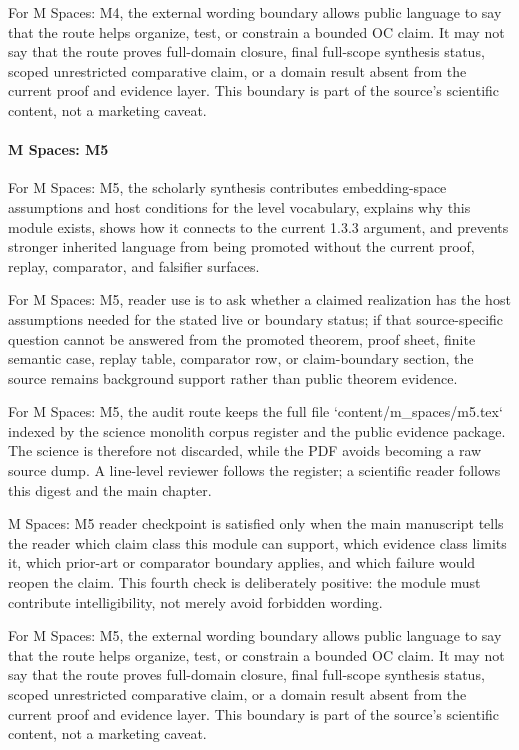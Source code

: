 For M Spaces: M4, the external wording boundary allows public language to say that the route helps organize, test, or constrain a bounded OC claim. It may not say that the route proves full-domain closure, final full-scope synthesis status, scoped unrestricted comparative claim, or a domain result absent from the current proof and evidence layer. This boundary is part of the source's scientific content, not a marketing caveat.


\paragraph{M Spaces: M5}

For M Spaces: M5, the scholarly synthesis contributes embedding-space assumptions and host conditions for the level vocabulary, explains why this module exists, shows how it connects to the current 1.3.3 argument, and prevents stronger inherited language from being promoted without the current proof, replay, comparator, and falsifier surfaces.


For M Spaces: M5, reader use is to ask whether a claimed realization has the host assumptions needed for the stated live or boundary status; if that source-specific question cannot be answered from the promoted theorem, proof sheet, finite semantic case, replay table, comparator row, or claim-boundary section, the source remains background support rather than public theorem evidence.


For M Spaces: M5, the audit route keeps the full file `content/m\_spaces/m5.tex` indexed by the science monolith corpus register and the public evidence package. The science is therefore not discarded, while the PDF avoids becoming a raw source dump. A line-level reviewer follows the register; a scientific reader follows this digest and the main chapter.


M Spaces: M5 reader checkpoint is satisfied only when the main manuscript tells the reader which claim class this module can support, which evidence class limits it, which prior-art or comparator boundary applies, and which failure would reopen the claim. This fourth check is deliberately positive: the module must contribute intelligibility, not merely avoid forbidden wording.


For M Spaces: M5, the external wording boundary allows public language to say that the route helps organize, test, or constrain a bounded OC claim. It may not say that the route proves full-domain closure, final full-scope synthesis status, scoped unrestricted comparative claim, or a domain result absent from the current proof and evidence layer. This boundary is part of the source's scientific content, not a marketing caveat.


